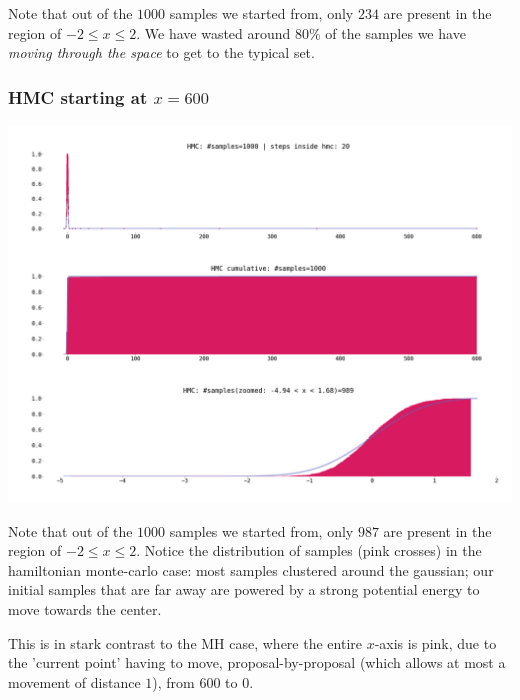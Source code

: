 \documentclass[titlepage]{article}
\begin{document}
Note that out of the $1000$ samples we started from, only $234$ are present
in the region of $-2 \leq x \leq 2$. We have wasted around $80\%$ of the
samples we have \emph{moving through the space} to get to the typical set.


\subsubsection{HMC starting at $x = 600$}

\includegraphics[width=\textwidth]{mcmc-hmc-1d-exp-startx-600.png}


Note that out of the $1000$ samples we started from, only $987$ are present
in the region of $-2 \leq x \leq 2$. Notice the distribution of samples
(pink crosses) in the hamiltonian monte-carlo case: most samples clustered around the gaussian;
our initial samples that are far away are powered by a strong potential energy
to move towards the center.

This is in stark contrast to the MH case, where the entire $x$-axis is pink,
due to the 'current point' having to move, proposal-by-proposal (which allows
at most a movement of distance $1$), from $600$ to $0$.
\end{document}
